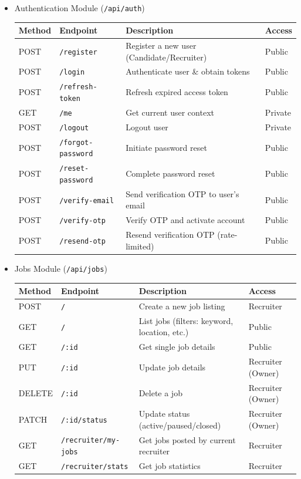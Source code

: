 \documentclass[a4paper, 14pt, openany]{extreport}
\begin{document}
	\begin{itemize}
		\item Authentication Module (\texttt{/api/auth})
		\begin{center}
		\footnotesize
		\begin{tabularx}{\linewidth}{|l|l|X|l|}
		\hline
		\textbf{Method} & \textbf{Endpoint} & \textbf{Description} & \textbf{Access} \\\hline
		POST & \texttt{/register} & Register a new user (Candidate/Recruiter) & Public \\\hline
		POST & \texttt{/login} & Authenticate user \& obtain tokens & Public \\\hline
		POST & \texttt{/refresh-token} & Refresh expired access token & Public \\\hline
		GET & \texttt{/me} & Get current user context & Private \\\hline
		POST & \texttt{/logout} & Logout user & Private \\\hline
		POST & \texttt{/forgot-password} & Initiate password reset & Public \\\hline
		POST & \texttt{/reset-password} & Complete password reset & Public \\\hline
		POST & \texttt{/verify-email} & Send verification OTP to user's email & Public \\\hline
		POST & \texttt{/verify-otp} & Verify OTP and activate account & Public \\\hline
		POST & \texttt{/resend-otp} & Resend verification OTP (rate-limited) & Public \\\hline
		\end{tabularx}
		\end{center}

		\item Jobs Module (\texttt{/api/jobs})
		\begin{center}
		\footnotesize
		\begin{tabularx}{\linewidth}{|l|l|X|l|}
		\hline
		\textbf{Method} & \textbf{Endpoint} & \textbf{Description} & \textbf{Access} \\\hline
		POST & \texttt{/} & Create a new job listing & Recruiter \\\hline
		GET & \texttt{/} & List jobs (filters: keyword, location, etc.) & Public \\\hline
		GET & \texttt{/:id} & Get single job details & Public \\\hline
		PUT & \texttt{/:id} & Update job details & Recruiter (Owner) \\\hline
		DELETE & \texttt{/:id} & Delete a job & Recruiter (Owner) \\\hline
		PATCH & \texttt{/:id/status} & Update status (active/paused/closed) & Recruiter (Owner) \\\hline
		GET & \texttt{/recruiter/my-jobs} & Get jobs posted by current recruiter & Recruiter \\\hline
		GET & \texttt{/recruiter/stats} & Get job statistics & Recruiter \\\hline
		\end{tabularx}
		\end{center}
		\newpage


\end{itemize}
\end{document}
